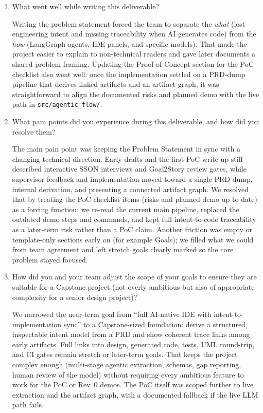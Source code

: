 \documentclass{article}
\begin{document}


\begin{enumerate}
    \item What went well while writing this deliverable?

    Writing the problem statement forced the team to separate the \emph{what}
    (lost engineering intent and missing traceability when AI generates code)
    from the \emph{how} (LangGraph agents, IDE panels, and specific models).
    That made the project easier to explain to non-technical readers and gave
    later documents a shared problem framing. Updating the Proof of Concept
    section for the PoC checklist also went well: once the implementation
    settled on a PRD-dump pipeline that derives linked artifacts and an
    artifact graph, it was straightforward to align the documented risks and
    planned demo with the live path in \texttt{src/agentic\_flow/}.

    \item What pain points did you experience during this deliverable, and how
    did you resolve them?

    The main pain point was keeping the Problem Statement in sync with a
    changing technical direction. Early drafts and the first PoC write-up still
    described interactive SSON interviews and Goal2Story review gates, while
    supervisor feedback and implementation moved toward a single PRD dump,
    internal derivation, and presenting a connected artifact graph. We resolved
    that by treating the PoC checklist items (risks and planned demo up to date)
    as a forcing function: we re-read the current main pipeline, replaced the
    outdated demo steps and commands, and kept full intent-to-code
    traceability as a later-term risk rather than a PoC claim. Another friction
    was empty or template-only sections early on (for example Goals); we filled
    what we could from team agreement and left stretch goals clearly marked so
    the core problem stayed focused.

    \item How did you and your team adjust the scope of your goals to ensure
    they are suitable for a Capstone project (not overly ambitious but also of
    appropriate complexity for a senior design project)?

    We narrowed the near-term goal from ``full AI-native IDE with
    intent-to-implementation sync'' to a Capstone-sized foundation: derive a
    structured, inspectable intent model from a PRD and show coherent
    trace links among early artifacts. Full links into design, generated code,
    tests, UML round-trip, and CI gates remain stretch or later-term goals.
    That keeps the project complex enough (multi-stage agentic extraction,
    schemas, gap reporting, human review of the model) without requiring every
    ambitious feature to work for the PoC or Rev~0 demos. The PoC itself was
    scoped further to live extraction and the artifact graph, with a documented
    fallback if the live LLM path fails.
\end{enumerate}
\end{document}
